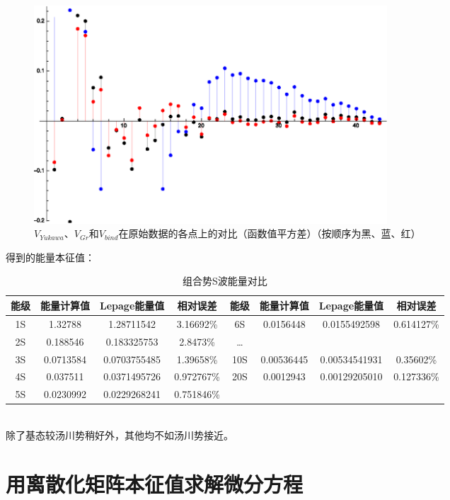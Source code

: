 \documentclass[hyperref]{ctexart}
\begin{document}
\begin{figure}[!htbp]
  \centering
  \includegraphics[width=5.2in]{Test_BindingEnergy_FitOtherwise3.eps}
  \caption{$V_{Yukawa}$、$V_{Gr}$和$V_{bind}$在原始数据的各点上的对比（函数值平方差）（按顺序为黑、蓝、红）}
\end{figure}
\clearpage
得到的能量本征值：
\begin{table}[!htbp]
  \centering
    \begin{tabular}{|cccccccc|}
    \hline
    能级 & 能量计算值 & Lepage能量值 & 相对误差 & 能级 & 能量计算值 & Lepage能量值 & 相对误差 \\
    \hline
    1S & 1.32788 & 1.28711542 & 3.16692\% & 6S & 0.0156448 & 0.0155492598 & 0.614127\% \\
    2S & 0.188546 & 0.183325753 & 2.8473\% & \dots &   &  & \\
    3S & 0.0713584 & 0.0703755485 & 1.39658\% & 10S & 0.00536445 & 0.00534541931 & 0.35602\% \\
    4S & 0.037511 & 0.0371495726 & 0.972767\% & 20S & 0.0012943 & 0.00129205010 &0.127336\%\\
    5S & 0.0230992 & 0.0229268241 & 0.751846\% &  &  & & \\
    \hline
  \end{tabular}
  \caption{组合势S波能量对比}
\end{table}\\
除了基态较汤川势稍好外，其他均不如汤川势接近。
\section{用离散化矩阵本征值求解微分方程}
\end{document}
